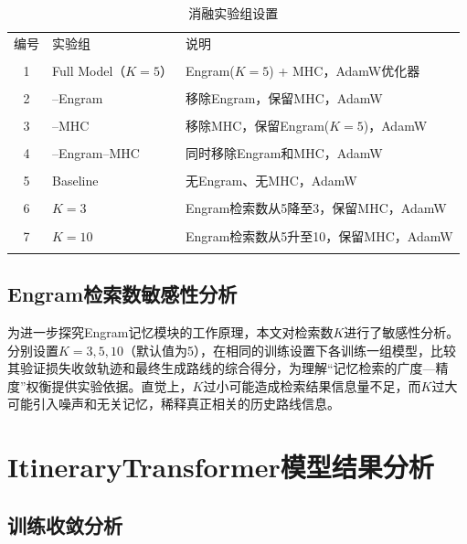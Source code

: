 \documentclass[12pt,a4paper]{ctexart}
\newenvironment{tighttable}
  {\setstretch{1.0}\small}
  {}
\begin{document}
\begin{table}[H]
\centering
\caption{消融实验组设置}
\label{tab:ablation_design}
\begin{tighttable}
\begin{tabular}{cll}
\toprule
编号 & 实验组 & 说明 \\\\
\midrule
1 & Full Model（$K=5$） & Engram($K=5$) + MHC，AdamW优化器 \\\\
2 & --Engram & 移除Engram，保留MHC，AdamW \\\\
3 & --MHC & 移除MHC，保留Engram($K=5$)，AdamW \\\\
4 & --Engram--MHC & 同时移除Engram和MHC，AdamW \\\\
5 & Baseline & 无Engram、无MHC，AdamW \\\\
6 & $K=3$ & Engram检索数从5降至3，保留MHC，AdamW \\\\
7 & $K=10$ & Engram检索数从5升至10，保留MHC，AdamW \\\\
\bottomrule
\end{tabular}
\end{tighttable}
\end{table}

\subsection{Engram检索数敏感性分析}

为进一步探究Engram记忆模块的工作原理，本文对检索数$K$进行了敏感性分析。分别设置$K=3,5,10$（默认值为5），在相同的训练设置下各训练一组模型，比较其验证损失收敛轨迹和最终生成路线的综合得分，为理解“记忆检索的广度—精度”权衡提供实验依据。直觉上，$K$过小可能造成检索结果信息量不足，而$K$过大可能引入噪声和无关记忆，稀释真正相关的历史路线信息。

\section{ItineraryTransformer模型结果分析}

\subsection{训练收敛分析}
\end{document}

